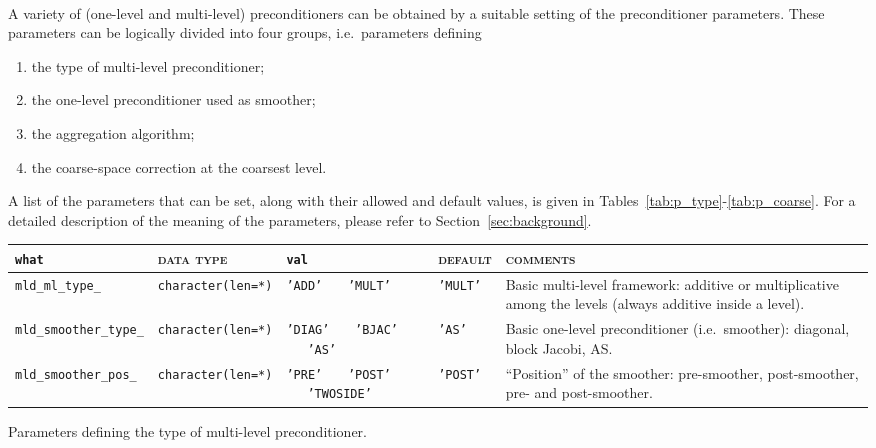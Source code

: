 \ \\
A variety of (one-level and multi-level) preconditioners can be obtained
by a suitable setting of the preconditioner parameters. These parameters
can be logically divided into four groups, i.e.\ parameters defining
\begin{enumerate}
	\item the type of multi-level preconditioner;
	\item the one-level preconditioner used as smoother;
	\item the aggregation algorithm;
	\item the coarse-space correction at the coarsest level.
\end{enumerate}
A list of the parameters that can be set, along with their allowed and
default values, is given in Tables~\ref{tab:p_type}-\ref{tab:p_coarse}.
For a detailed description  of the meaning of the parameters, please
refer to Section~\ref{sec:background}. 
%

\bsideways
\begin{center}
\begin{tabular}{|l|l|p{2cm}|l|p{7cm}|}
\hline
\verb|what|              & \textsc{data type}        &  \verb|val|      &  \textsc{default}  &
\textsc{comments} \\ \hline
\verb|mld_ml_type_|      & \verb|character(len=*)|
                         & \texttt{'ADD'} \ \ \ \texttt{'MULT'}   
                         & \texttt{'MULT'}
                         & Basic multi-level framework: additive or multiplicative
                           among the levels (always additive inside a level).         \\ \hline 
\verb|mld_smoother_type_|& \verb|character(len=*)|
                         & \texttt{'DIAG'} \ \ \ \texttt{'BJAC'} \ \ \ \texttt{'AS'}
                         & \texttt{'AS'}
                         & Basic one-level preconditioner (i.e.\ smoother): diagonal,
                           block Jacobi, AS. \\ \hline
\verb|mld_smoother_pos_| & \verb|character(len=*)|
                         & \texttt{'PRE'} \ \ \ \texttt{'POST'} \ \ \ \texttt{'TWOSIDE'}
                         & \texttt{'POST'}
                         & ``Position'' of the smoother: pre-smoother, post-smoother, 
                           pre- and post-smoother. \\
\hline
\end{tabular}
\end{center}
\caption{Parameters defining the type of multi-level preconditioner.
\label{tab:p_type}}                       
\esideways
                   
